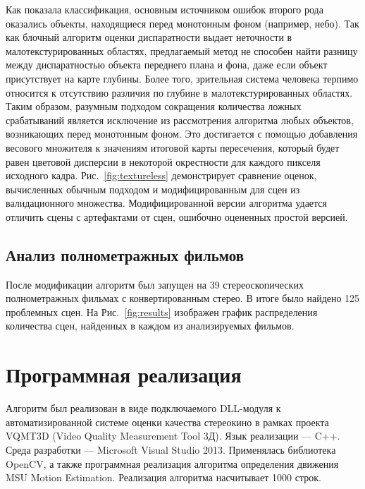 \documentclass[14pt, a4paper]{extarticle}
\begin{document}


Как показала классификация, основным источником ошибок второго рода оказались
объекты, находящиеся перед монотонным фоном (например, небо). Так как блочный
алгоритм оценки диспаратности выдает неточности в малотекстурированных 
областях, предлагаемый метод не способен найти разницу между диспаратностью
объекта переднего плана и фона, даже если объект присутствует на карте глубины.
Более того, зрительная система человека терпимо относится к отсутствию различия
по глубине в малотекстурированных областях. Таким образом, разумным подходом
сокращения количества ложных срабатываний  является исключение из рассмотрения
алгоритма любых объектов, возникающих перед монотонным фоном. Это достигается
с помощью добавления весового множителя к значениям итоговой карты пересечения,
который будет равен цветовой дисперсии в некоторой окрестности для
каждого пикселя исходного кадра. Рис.~\ref{fig:textureless} демонстрирует
сравнение оценок, вычисленных обычным подходом и модифицированным 
для сцен из валидационного множества. Модифицированной версии алгоритма удается
отличить сцены с артефактами от сцен, ошибочно оцененных простой версией.

\subsection{Анализ полнометражных фильмов}



После модификации алгоритм был запущен на 39 стереоскопических полнометражных
фильмах с конвертированным стерео. В итоге было найдено 125 проблемных сцен. 
На Рис.~\ref{fig:results} изображен график распределения количества сцен, 
найденных в каждом из анализируемых фильмов.



\newpage
\newpage
\newpage
\clearpage
\section{Программная реализация}

Алгоритм был реализован в виде подключаемого DLL-модуля к автоматизированной 
системе оценки качества стереокино в рамках проекта VQMT3D 
(Video Quality Measurement Tool 3Д). Язык реализации --- C++. Среда разработки --- 
Microsoft Visual Studio 2013. Применялась библиотека OpenCV, а также программная 
реализация алгоритма определения движения MSU Motion Estimation. 
Реализация алгоритма насчитывает 1000 строк. 
\end{document}
